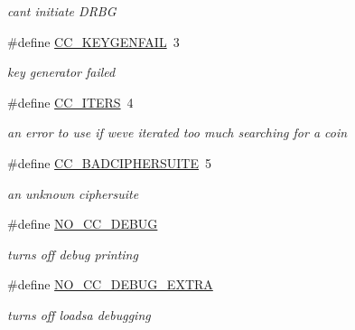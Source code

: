 \begin{DoxyCompactItemize}
\begin{DoxyCompactList}\small\item\em can\textquotesingle{}t initiate D\+R\+BG \end{DoxyCompactList}\item 
\mbox{\label{cs2014coin-int_8h_a38c67b7590b216f386011c1abb1e139c}} 
\#define \hyperlink{cs2014coin-int_8h_a38c67b7590b216f386011c1abb1e139c}{C\+C\+\_\+\+K\+E\+Y\+G\+E\+N\+F\+A\+IL}~3
\begin{DoxyCompactList}\small\item\em key generator failed \end{DoxyCompactList}\item 
\mbox{\label{cs2014coin-int_8h_a1147a2a3b8060721af3ae0907a76a50e}} 
\#define \hyperlink{cs2014coin-int_8h_a1147a2a3b8060721af3ae0907a76a50e}{C\+C\+\_\+\+I\+T\+E\+RS}~4
\begin{DoxyCompactList}\small\item\em an error to use if we\textquotesingle{}ve iterated too much searching for a coin \end{DoxyCompactList}\item 
\mbox{\label{cs2014coin-int_8h_a3ed3e314f0241fad2ac2379da85b8c70}} 
\#define \hyperlink{cs2014coin-int_8h_a3ed3e314f0241fad2ac2379da85b8c70}{C\+C\+\_\+\+B\+A\+D\+C\+I\+P\+H\+E\+R\+S\+U\+I\+TE}~5
\begin{DoxyCompactList}\small\item\em an unknown ciphersuite \end{DoxyCompactList}\item 
\#define \hyperlink{cs2014coin-int_8h_a0f02326e76cf787367d95020eac57531}{N\+O\+\_\+\+C\+C\+\_\+\+D\+E\+B\+UG}
\begin{DoxyCompactList}\small\item\em turns off debug printing \end{DoxyCompactList}\item 
\#define \hyperlink{cs2014coin-int_8h_afa38166e59791a080ff9c3096c84146a}{N\+O\+\_\+\+C\+C\+\_\+\+D\+E\+B\+U\+G\+\_\+\+E\+X\+T\+RA}
\begin{DoxyCompactList}\small\item\em turns off loadsa debugging \end{DoxyCompactList}\end{DoxyCompactItemize}
